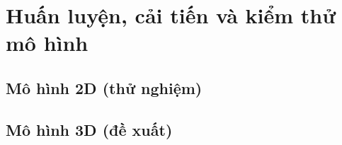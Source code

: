 \chapter{Huấn luyện, cải tiến và kiểm thử mô hình}
\section{Mô hình 2D (thử nghiệm)}
\section{Mô hình 3D (đề xuất)}


